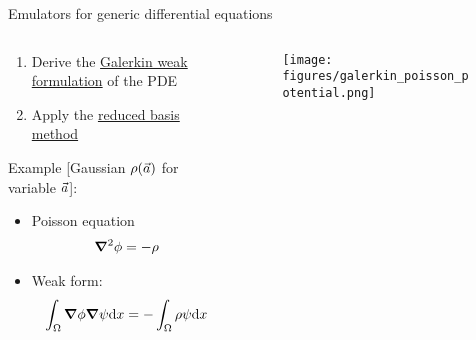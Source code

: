 \documentclass[xcolor=dvipsnames, aspectratio=169]{beamer}
\begin{document}
\begin{frame}{Emulators for generic differential equations}
\begin{columns}[t]
\begin{column}{0.5\textwidth}
\begin{enumerate}
\item Derive the \alert{\href{https://en.wikipedia.org/wiki/Galerkin_method}{Galerkin weak formulation}} of the PDE
\item Apply the \alert{\href{https://doi.org/10.1137/151004550}{reduced basis method}}
\end{enumerate}
Example [Gaussian $\rho(\vec{a})$ for variable $\vec{a}$]:
\begin{itemize}
\item Poisson equation
\begin{align*}
\grad^2 \phi = -\rho
\end{align*}
\item Weak form:
\begin{align*}
\int_{\Omega} \grad\phi\grad\psi \textup{d}x = -\int_{\Omega}\rho \psi \textup{d}x
\end{align*}
\end{itemize}
\end{column}
\begin{column}{0.5\textwidth}
\begin{figure}
\vspace{-0.4cm}
\texttt{[image: figures/galerkin\_poisson\_potential.png]}
\end{figure}
\end{column}
\end{columns}
\end{frame}


\end{document}
